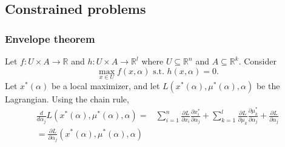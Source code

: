 \documentclass[compress]{beamer}
\def\R{\mathbb{R}}
\renewcommand{\to}{{\rightarrow}}
\begin{document}
\subsection{Constrained problems}
\begin{frame} \frametitle{Envelope theorem}
  Let $f:U \times A \to \R$ and $h:U \times A \to \R^l$ where $U
  \subseteq \R^n$ and $A \subseteq \R^k$. Consider
  \[ \max_{x \in U} f(x,\alpha) \text{ s.t. } h(x,\alpha) = 0. \]
  Let $x^*(\alpha)$ be a local maximizer, and let
  $L(x^*(\alpha),\mu^*(\alpha),\alpha)$ be the Lagrangian. Using the
  chain rule, 
  \begin{align*}
    \frac{d}{d \alpha_j} L(x^*(\alpha),\mu^*(\alpha),\alpha) = & \sum_{i=1}^n
    \frac{\partial L}{\partial x_i} \frac{\partial x_i^*}{\partial
      \alpha_j} + \sum_{k=1}^l\frac{\partial L}{\partial
      \mu_k} \frac{\partial \mu_k^*}{\partial 
      \alpha_j}   + \frac{\partial L}{\partial \alpha_j } \\
    = \frac{\partial L}{\partial \alpha_j
    }(x^*(\alpha),\mu^*(\alpha),\alpha) 
  \end{align*}
\end{frame}
\end{document}

